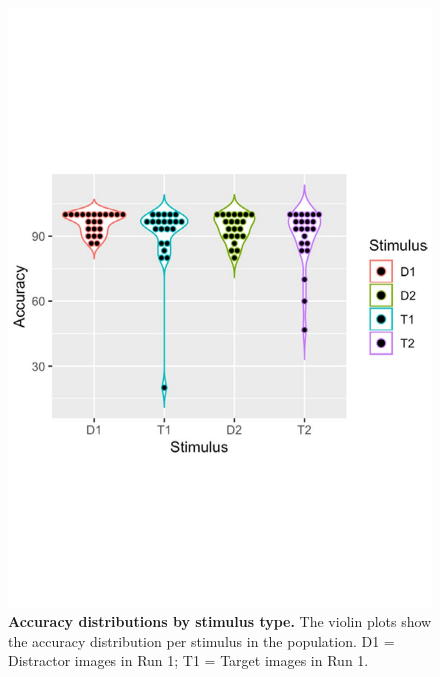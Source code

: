 \begin{figure}[h] 
\centering\includegraphics[width=0.7\linewidth]{images/Ch4/Figure3_Violin.pdf}
\caption{\textbf{Accuracy distributions by stimulus type.  }   The violin plots show the accuracy distribution per stimulus in the population. D1 = Distractor images in Run 1; T1 = Target images in Run 1.} \label{fig:Fig3}
\end{figure}



